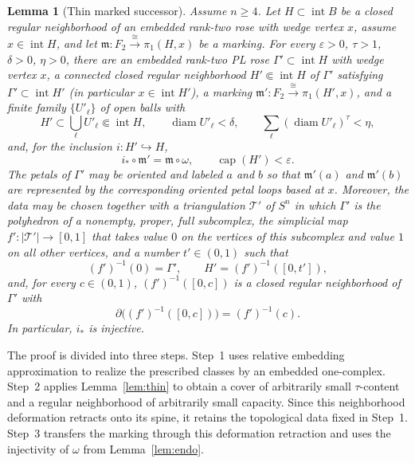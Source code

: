 \documentclass[12pt,oneside,a4paper]{article}
\theoremstyle{mytheorem}
\newtheorem{lemma}[definition]{Lemma}
\theoremstyle{remark}
\theoremstyle{definition}
\begin{document}
\begin{lemma}[Thin marked successor]\label{successor}
Assume \(n\geq4\).  Let $H\subset\operatorname{int}B$ be a closed regular
neighborhood of an embedded rank-two rose with wedge vertex \(x\), assume
$x\in\operatorname{int}H$, and let
$\mathfrak{m}:F_2\xrightarrow{\cong}\pi_1(H,x)$ be a marking.  For every
$\varepsilon>0$, $\tau>1$, $\delta>0$, $\eta>0$, there are an embedded
rank-two PL rose $\Gamma'\subset\operatorname{int}H$ with wedge vertex
$x$, a connected closed regular neighborhood
$H'\Subset\operatorname{int}H$ of $\Gamma'$ satisfying
$\Gamma'\subset\operatorname{int}H'$
(in particular $x\in\operatorname{int}H'$), a marking
$\mathfrak{m}':F_2\xrightarrow{\cong}\pi_1(H',x)$, and a
finite family $\{U'_\ell\}$ of open balls with
\[
 H'\subset\bigcup_\ell U'_\ell\Subset\operatorname{int}H,
 \qquad
 \operatorname{diam}U'_\ell<\delta,
 \qquad
 \sum_\ell(\operatorname{diam}U'_\ell)^\tau<\eta,
\]
and, for the inclusion $i:H'\hookrightarrow H$,
\[
 i_*\circ\mathfrak{m}'=\mathfrak{m}\circ\omega,
 \qquad
 \operatorname{cap}(H')<\varepsilon.
\]
The petals of $\Gamma'$ may be oriented and labeled $a$ and $b$ so
that $\mathfrak{m}'(a)$ and $\mathfrak{m}'(b)$ are represented by the
corresponding oriented petal loops based at $x$.  Moreover, the data may
be chosen together with a triangulation $\mathcal{T}'$ of $S^n$ in which
$\Gamma'$ is the polyhedron of a nonempty, proper, full subcomplex, the simplicial map
$f':|\mathcal{T}'|\to[0,1]$ that takes value $0$ on the vertices of this
subcomplex and value $1$ on all other vertices, and a number
$t'\in(0,1)$ such that
\[
(f')^{-1}(0)=\Gamma',\qquad H'=(f')^{-1}([0,t']),
\]
and, for every $c\in(0,1)$, $(f')^{-1}([0,c])$ is a closed regular
neighborhood of $\Gamma'$ with
\[
\partial\bigl((f')^{-1}([0,c])\bigr)=(f')^{-1}(c).
\]
In particular, $i_*$ is injective.
\end{lemma}



The proof is divided into three steps.  Step~1 uses relative embedding approximation
to realize the prescribed classes by an embedded one-complex.  Step~2
applies Lemma~\ref{lem:thin} to obtain a
cover of arbitrarily small $\tau$-content and a regular neighborhood of
arbitrarily small capacity.  Since this neighborhood deformation retracts
onto its spine, it retains the topological data fixed in Step~1.  Step~3
transfers the marking through this deformation retraction and uses the
injectivity of $\omega$ from Lemma~\ref{lem:endo}.
\end{document}
